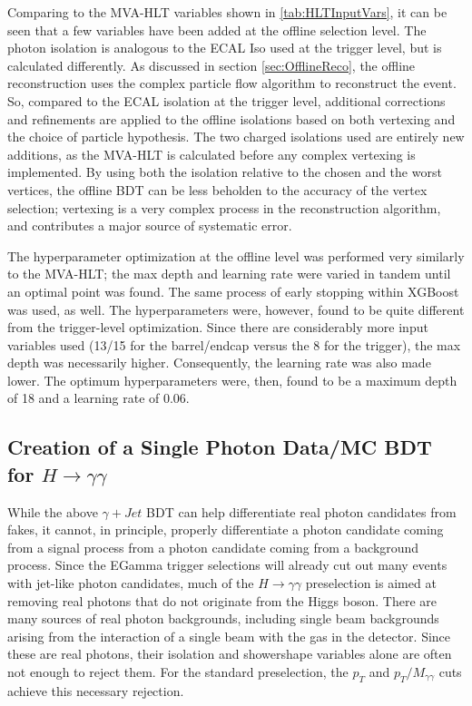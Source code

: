 \documentclass[12pt]{ucsddissertation}
\begin{document}
Comparing to the MVA-HLT variables shown in \ref{tab:HLTInputVars}, it can be seen that a few variables have been added at the offline selection level. The photon isolation is analogous to the ECAL Iso used at the trigger level, but is calculated differently. As discussed in section \ref{sec:OfflineReco}, the offline reconstruction uses the complex particle flow algorithm to reconstruct the event. So, compared to the ECAL isolation at the trigger level, additional corrections and refinements are applied to the offline isolations based on both vertexing and the choice of particle hypothesis. The two charged isolations used are entirely new additions, as the MVA-HLT is calculated before any complex vertexing is implemented. By using both the isolation relative to the chosen and the worst vertices, the offline BDT can be less beholden to the accuracy of the vertex selection; vertexing is a very complex process in the reconstruction algorithm, and contributes a major source of systematic error. 

The hyperparameter optimization at the offline level was performed very similarly to the MVA-HLT; the max depth and learning rate were varied in tandem until an optimal point was found. The same process of early stopping within XGBoost was used, as well. The hyperparameters were, however, found to be quite different from the trigger-level optimization. Since there are considerably more input variables used (13/15 for the barrel/endcap versus the 8 for the trigger), the max depth was necessarily higher. Consequently, the learning rate was also made lower. The optimum hyperparameters were, then, found to be a maximum depth of 18 and a learning rate of 0.06. 

\subsection{Creation of a Single Photon Data/MC BDT for $H \rightarrow \gamma \gamma$}
While the above $\gamma + Jet$ BDT can help differentiate real photon candidates from fakes, it cannot, in principle, properly differentiate a photon candidate coming from a signal process from a photon candidate coming from a background process. Since the EGamma trigger selections will already cut out many events with jet-like photon candidates, much of the $H \rightarrow \gamma \gamma$ preselection is aimed at removing real photons that do not originate from the Higgs boson. There are many sources of real photon backgrounds, including single beam backgrounds arising from the interaction of a single beam with the gas in the detector. Since these are real photons, their isolation and showershape variables alone are often not enough to reject them. For the standard preselection, the $p_T$ and $p_T/M_{\gamma \gamma}$ cuts achieve this necessary rejection.  
\end{document}
